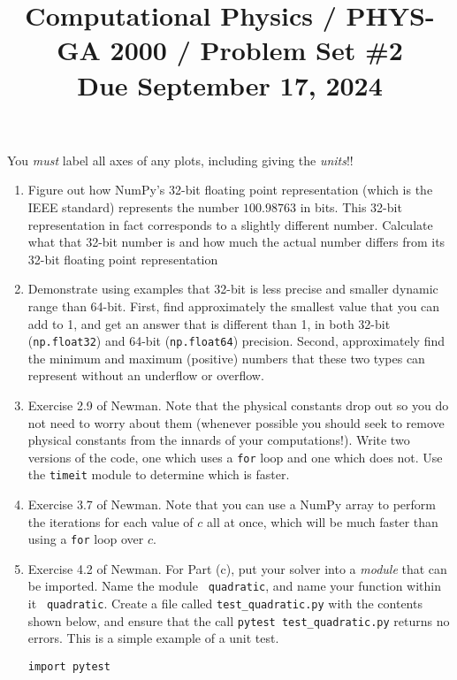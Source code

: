 \documentclass[11pt, preprint]{aastex}
\begin{document}
\title{\bf Computational Physics / PHYS-GA 2000 / Problem Set \#2
\\ Due September 17, 2024 }

You {\it must} label all axes of any plots, including giving the {\it
  units}!!

\begin{enumerate}

  \item Figure out how NumPy's 32-bit floating point representation
    (which is the IEEE standard) represents the number $100.98763$ in
    bits. This 32-bit representation in fact corresponds to a slightly
    different number. Calculate what that 32-bit number is and how
    much the actual number differs from its 32-bit floating point
    representation

  \item Demonstrate using examples that 32-bit is less precise and
    smaller dynamic range than 64-bit. First, find approximately the
    smallest value that you can add to 1, and get an answer that is
    different than 1, in both 32-bit ({\tt np.float32}) and 64-bit
    ({\tt np.float64}) precision. Second, approximately find the
    minimum and maximum (positive) numbers that these two types can
    represent without an underflow or overflow.

  \item Exercise 2.9 of Newman. Note that the physical constants drop
    out so you do not need to worry about them (whenever possible you
    should seek to remove physical constants from the innards of your
    computations!).  Write two versions of the code, one which uses a
    {\tt for} loop and one which does not.  Use the {\tt timeit}
    module to determine which is faster.

  \item Exercise 3.7 of Newman.  Note that you can use a NumPy array
    to perform the iterations for each value of $c$ all at once, which
    will be much faster than using a {\tt for} loop over $c$.

  \item Exercise 4.2 of Newman. For Part (c), put your solver into a
    {\it module} that can be imported. Name the module {\tt
      quadratic}, and name your function within it {\tt
      quadratic}. Create a file called {\tt test\_quadratic.py} with
    the contents shown below, and ensure that the call {\tt pytest
      test\_quadratic.py} returns no errors. This is a simple example
    of a unit test.
\begin{verbatim}
import pytest


\end{verbatim}
\end{enumerate}
\end{document}
